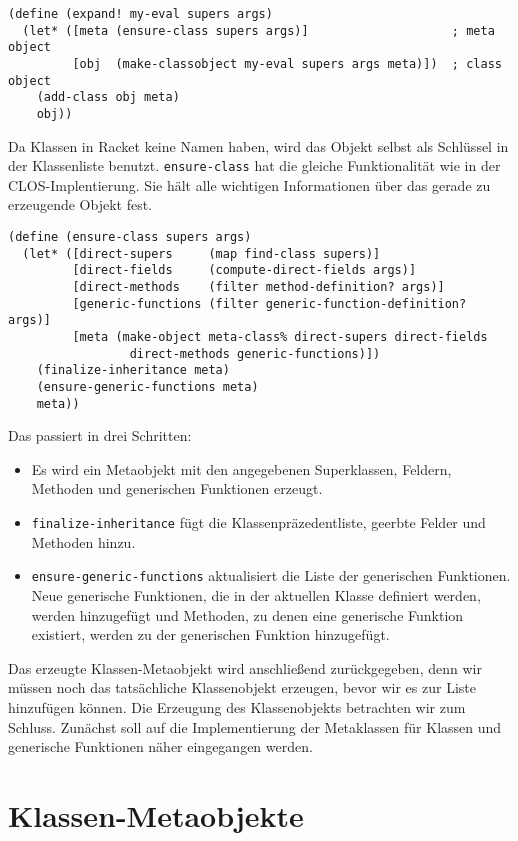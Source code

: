 \begin{lstlisting}
(define (expand! my-eval supers args)
  (let* ([meta (ensure-class supers args)]                    ; meta object
         [obj  (make-classobject my-eval supers args meta)])  ; class object
    (add-class obj meta)
    obj))
\end{lstlisting}

Da Klassen in Racket keine Namen haben, wird das Objekt selbst als Schlüssel in der Klassenliste benutzt. \texttt{ensure-class} hat die gleiche Funktionalität wie in der CLOS-Implentierung. Sie hält alle wichtigen Informationen über das gerade zu erzeugende Objekt fest. 

\begin{lstlisting}
(define (ensure-class supers args)
  (let* ([direct-supers     (map find-class supers)]  
         [direct-fields     (compute-direct-fields args)]
         [direct-methods    (filter method-definition? args)]
         [generic-functions (filter generic-function-definition? args)]
         [meta (make-object meta-class% direct-supers direct-fields
                 direct-methods generic-functions)])
    (finalize-inheritance meta)
    (ensure-generic-functions meta)
    meta))
\end{lstlisting}


Das passiert in drei Schritten:
\begin{itemize}
 \item Es wird ein Metaobjekt mit den angegebenen Superklassen, Feldern, Methoden und generischen Funktionen erzeugt.
 \item \texttt{finalize-inheritance} fügt die Klassenpräzedentliste, geerbte Felder und Methoden hinzu.
 \item \texttt{ensure-generic-functions} aktualisiert die Liste der generischen Funktionen. Neue generische Funktionen, die in der aktuellen Klasse definiert werden, werden hinzugefügt und Methoden, zu denen eine generische Funktion existiert, werden zu der generischen Funktion hinzugefügt.
\end{itemize}

Das erzeugte Klassen-Metaobjekt wird anschließend zurückgegeben, denn wir müssen noch das tatsächliche Klassenobjekt erzeugen, bevor wir es zur Liste hinzufügen können. Die Erzeugung des Klassenobjekts betrachten wir zum Schluss. Zunächst soll auf die Implementierung der Metaklassen für Klassen und generische Funktionen näher eingegangen werden.

\section{Klassen-Metaobjekte}


